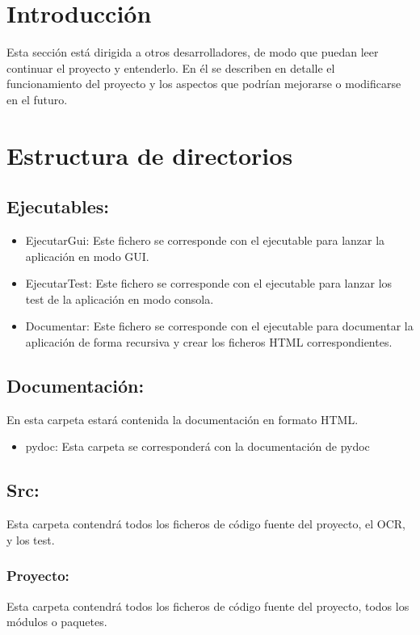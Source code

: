 
\section{Introducción}
Esta sección está dirigida a otros desarrolladores, de modo que puedan leer continuar el proyecto y entenderlo. En él se describen en detalle el funcionamiento del proyecto y los aspectos que podrían mejorarse o modificarse en el futuro.
\section{Estructura de directorios}

\subsection{Ejecutables:} 
	\begin{itemize}
		\item EjecutarGui: Este fichero se corresponde con el ejecutable para lanzar la aplicación en modo GUI.
		\item EjecutarTest: Este fichero se corresponde con el ejecutable para lanzar los test de la aplicación en modo consola.
		\item Documentar: Este fichero se corresponde con el ejecutable para documentar la aplicación de forma recursiva y crear los ficheros HTML correspondientes.
	\end{itemize}
		
\subsection{Documentación:}
En esta carpeta estará contenida la documentación en formato HTML.
	\begin{itemize}
		\item pydoc: Esta carpeta se corresponderá con la documentación de pydoc
	\end{itemize}

\subsection{Src:}
Esta carpeta contendrá todos los ficheros de código fuente del proyecto, el OCR, y los test.

\subsubsection{Proyecto:}
Esta carpeta contendrá todos los ficheros de código fuente del proyecto, todos los módulos o paquetes.

